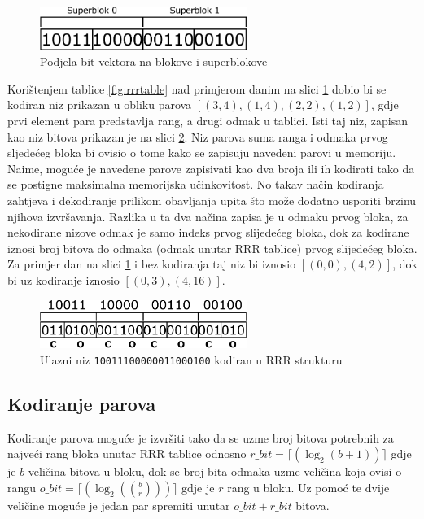 \begin{figure}[H]
	\centering
	\includegraphics[width=0.6\textwidth]{img/superblocks.pdf}
	\caption{Podjela bit-vektora na blokove i superblokove}
	\label{fig:blocks}
\end{figure} 

Korištenjem tablice \ref{fig:rrrtable} nad primjerom danim na slici \ref{fig:blocks} dobio bi se kodiran niz prikazan u obliku parova $[(3, 4), (1, 4), (2, 2), (1, 2)]$, gdje prvi element para predstavlja rang, a drugi odmak u tablici. Isti taj niz, zapisan kao niz bitova prikazan je na slici \ref{fig:codecseq}. Niz parova suma ranga i odmaka prvog sljedećeg bloka bi ovisio o tome kako se zapisuju navedeni parovi u memoriju. Naime, moguće je navedene parove zapisivati kao dva broja ili ih kodirati tako da se postigne maksimalna memorijska učinkovitost. No takav način kodiranja zahtjeva i dekodiranje prilikom obavljanja upita što može dodatno usporiti brzinu njihova izvršavanja. Razlika u ta dva načina zapisa je u odmaku prvog bloka, za nekodirane nizove odmak je samo indeks prvog slijedećeg bloka, dok za kodirane iznosi broj bitova do odmaka (odmak unutar RRR tablice) prvog slijedećeg bloka. Za primjer dan na slici \ref{fig:blocks} i bez kodiranja taj niz bi iznosio $[(0, 0), (4, 2)]$, dok bi uz kodiranje iznosio $[(0, 3), (4, 16)]$.

\begin{figure}[H]
	\centering
	\includegraphics[width=0.6\textwidth]{img/coded.pdf}
	\caption{Ulazni niz \texttt{10011100000011000100} kodiran u RRR strukturu}
	\label{fig:codecseq}
\end{figure}

\subsection{Kodiranje parova}

Kodiranje parova moguće je izvršiti tako da se uzme broj bitova potrebnih za najveći rang bloka unutar RRR tablice odnosno $r\_bit=\lceil(\log_2(b + 1))\rceil$ gdje je $b$ veličina bitova u bloku, dok se broj bita odmaka uzme veličina koja ovisi o rangu $o\_bit=\lceil(\log_2({b \choose r}))\rceil$ gdje je $r$ rang u bloku. Uz pomoć te dvije veličine moguće je jedan par spremiti unutar $o\_bit+r\_bit$ bitova.

